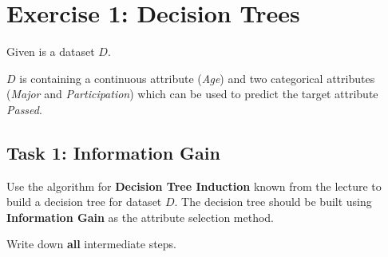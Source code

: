 \documentclass[
english,
smallborders
]{i6prcsht}
\begin{document}
\section*{Exercise 1: Decision Trees}

\begin{minipage}{.5\textwidth}
	Given is a dataset $D$.

	\vspace*{0.5cm}

	$D$ is containing a continuous attribute (\textit{Age}) and two categorical attributes (\textit{Major} and \textit{Participation}) which can be used to predict the target attribute \textit{Passed}.
\end{minipage}
\begin{minipage}{.5\textwidth}
	\begin{flushright}
	\end{flushright}
\end{minipage}

\subsection*{Task 1: Information Gain}

Use the algorithm for \textbf{Decision Tree Induction} known from the lecture to build a decision tree for dataset $D$. The decision tree should be built using \textbf{Information Gain} as the attribute selection method.

Write down \textbf{all} intermediate steps.
\end{document}
